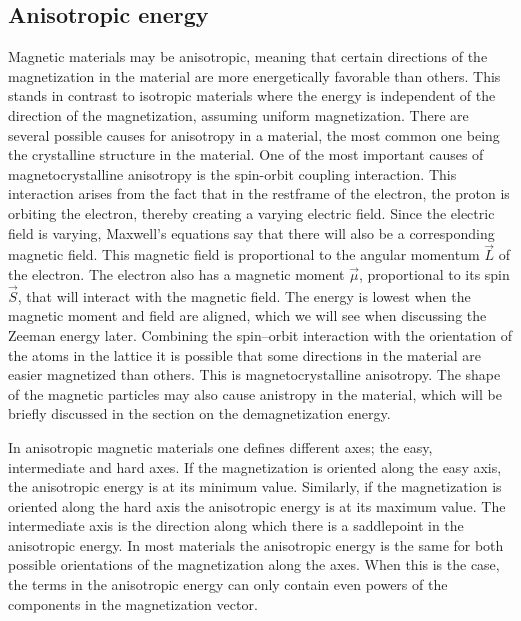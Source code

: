 \documentclass[12pt, a4paper, twoside, openright]{article}		%
\numberwithin{equation}{section}
\begin{document}
\subsection{Anisotropic energy}
Magnetic materials may be anisotropic, meaning that certain directions of the magnetization in the material are more energetically favorable than others. This stands in contrast to isotropic materials where the energy is independent of the direction of the magnetization, assuming uniform magnetization. There are several possible causes for anisotropy in a material, the most common one being the crystalline structure in the material. One of the most important causes of magnetocrystalline anisotropy is the spin-orbit coupling interaction. This interaction arises from the fact that in the restframe of the electron, the proton is orbiting the electron, thereby creating a varying electric field. Since the electric field is varying, Maxwell's equations say that there will also be a corresponding magnetic field. This magnetic field is proportional to the angular momentum $\vec{L}$ of the electron. The electron also has a magnetic moment $\vec{\mu}$, proportional to its spin $\vec{S}$, that will interact with the magnetic field. The energy is lowest when the magnetic moment and field are aligned, which we will see when discussing the Zeeman energy later. Combining the spin--orbit interaction with the orientation of the atoms in the lattice it is possible that some directions in the material are easier magnetized than others. This is magnetocrystalline anisotropy. The shape of the magnetic particles may also cause anistropy in the material, which will be briefly discussed in the section on the demagnetization energy. 

In anisotropic magnetic materials one defines different axes; the easy, intermediate and hard axes. If the magnetization is oriented along the easy axis, the anisotropic energy is at its minimum value. Similarly, if the magnetization is oriented along the hard axis the anisotropic energy is at its maximum value. The intermediate axis is the direction along which there is a saddlepoint in the anisotropic energy. In most materials the anisotropic energy is the same for both possible orientations of the magnetization along the axes. When this is the case, the terms in the anisotropic energy can only contain even powers of the components in the magnetization vector.
\end{document}
